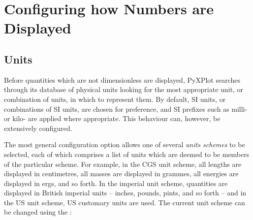 
\section{Configuring how Numbers are Displayed}
\label{sec:unitdisp}

\subsection{Units}

Before quantities which are not dimensionless are displayed, PyXPlot searches
through its database of physical units looking for the most appropriate unit,
or combination of units, in which to represent them.  By default, SI units, or
combinations of SI units, are chosen for preference, and SI prefixes such as
milli- or kilo- are applied where appropriate. This behaviour can, however, be
extensively configured.

The most general configuration option allows one of several {\it units
schemes} to be selected, each of which comprises a
list of units which are deemed to be members of the particular scheme. For
example, in the CGS unit scheme, all lengths
are displayed in centimetres, all masses are displayed in grammes, all energies
are displayed in ergs, and so forth.  In the imperial unit
scheme, quantities are displayed in
British imperial units -- inches, pounds, pints, and so forth -- and in the US
unit scheme, US customary units are used. The current unit scheme can be
changed using the :

